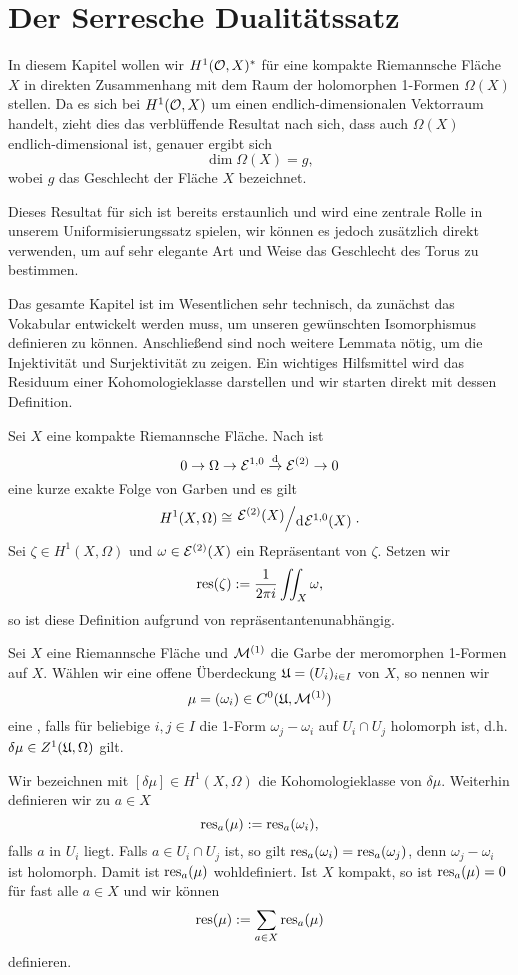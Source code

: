 \section{Der Serresche Dualitätssatz}
\label{sec:serre}

In diesem Kapitel wollen wir $H^1(\mathcal{O}, X)^\ast$ für eine kompakte
Riemannsche Fläche $X$ in direkten Zusammenhang mit dem Raum der
holomorphen 1-Formen $\Omega(X)$ stellen. Da es sich bei $H^1(\mathcal{O},
X)$ um einen endlich-dimensionalen Vektorraum handelt, zieht dies das
verblüffende Resultat nach sich, dass auch $\Omega(X)$
endlich-dimensional ist, genauer ergibt sich
\[
\dim \Omega(X) = g,
\]
wobei $g$ das Geschlecht der Fläche $X$ bezeichnet.

Dieses Resultat für sich ist bereits erstaunlich und wird eine
zentrale Rolle in unserem Uniformisierungssatz spielen, wir können es
jedoch zusätzlich direkt verwenden, um auf sehr elegante Art und Weise das
Geschlecht des Torus zu bestimmen.

Das gesamte Kapitel ist im Wesentlichen sehr technisch, da zunächst
das Vokabular entwickelt werden muss, um unseren gewünschten
Isomorphismus definieren zu können. Anschließend sind noch weitere
Lemmata nötig, um die Injektivität und Surjektivität zu
zeigen. Ein wichtiges Hilfsmittel wird das Residuum einer
Kohomologieklasse darstellen und wir starten direkt mit dessen Definition.

\begin{defin}
  \label{def:res}
  Sei $X$ eine kompakte Riemannsche Fläche. Nach \cite[Satz 15.14]{For} ist
  \[
  0 \ra \Omega \ra \diff^{1,0} \xrightarrow{\d} \diff^{(2)} \ra 0
  \]
  eine kurze exakte Folge von Garben und es gilt
  \[
  H^1(X, \Omega) \cong \quot{\diff^{(2)}(X)}{\d[\diff^{1,0}(X)]}.
  \]
  Sei $\zeta \in H^1(X,
  \Omega)$ und $\omega \in \mathcal{E}^{(2)}(X)$ ein Repräsentant von
  $\zeta$. Setzen wir
  \[
  \operatorname{res}(\zeta) := \frac{1}{2\pi i} \iint_X \omega,
  \]
  so ist diese Definition aufgrund von \cite[Satz 10.20]{For} repräsentantenunabhängig.
\end{defin}

\begin{defin}
  \label{def:mlv}
  Sei $X$ eine Riemannsche Fläche und $\mathcal{M}^{(1)}$ die Garbe der
  meromorphen 1-Formen auf $X$. Wählen wir eine offene Überdeckung
  $\mathfrak{U} = (U_i)_{i \in I}$ von $X$, so nennen wir
  \[
  \mu = (\omega_i) \in C^0( \mathfrak{U}, \mathcal{M}^{(1)})
  \]
  eine , falls für beliebige $i,j \in
  I$ die 1-Form $\omega_j - \omega_i$ auf $U_i \cap U_j$ holomorph
  ist, d.h. $ \delta \mu \in Z^1(\mathfrak{U}, \Omega)$ gilt.

  Wir bezeichnen mit $[\delta \mu] \in H^1(X, \Omega)$ die
  Kohomologieklasse von $\delta \mu$. Weiterhin definieren wir zu $a \in X$
  \[
  \operatorname{res}_a(\mu) := \operatorname{res}_a(\omega_i),
  \]
  falls $a$ in $U_i$ liegt. Falls $a \in U_i \cap U_j$ ist, so gilt
  $\operatorname{res}_a(\omega_i) = \operatorname{res}_a(\omega_j)$, denn $\omega_j - \omega_i$
  ist holomorph. Damit ist $\operatorname{res}_a(\mu)$ wohldefiniert. Ist $X$
  kompakt, so ist $\operatorname{res}_a(\mu) = 0$ für fast alle $a \in X$ und wir können
  \[
  \operatorname{res}(\mu) := \sum_{a \in X} \operatorname{res}_a(\mu)
  \]
  definieren.
\end{defin}

